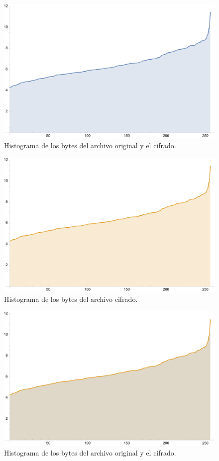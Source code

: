 \documentclass[a4paper]{article}
\begin{document}
\begin{figure}[H]
    \centering
    \includegraphics[scale=0.7]{historygramorig}
    \caption*{Histograma de los bytes del archivo
original y el cifrado.}\label{fig:d1}
\end{figure}

\begin{figure}[H]
    \centering
    \includegraphics[scale=0.7]{historygramorig2}
    \caption*{Histograma de los bytes del archivo cifrado.}
    \label{fig:d3}
\end{figure}

\begin{figure}[H]
    \centering
    \includegraphics[scale=0.7]{historygram}
    \caption*{Histograma de los bytes del archivo
original y el cifrado.}\label{fig:d2}
\end{figure}
\end{document}
